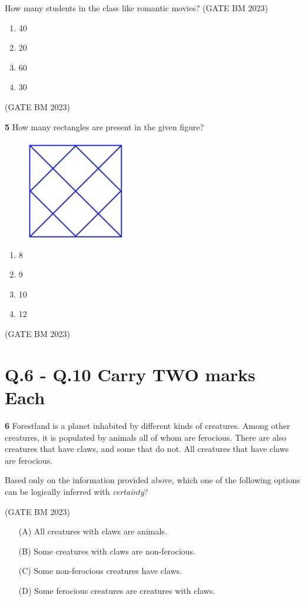 \documentclass[journal]{IEEEtran}
\numberwithin{equation}{enumi}
\numberwithin{figure}{enumi}
\begin{document}
How many students in the class like romantic movies?
\hfill (GATE BM 2023)

\begin{enumerate}
    \item 40
    \item 20
    \item 60
    \item 30
\end{enumerate}
\hfill (GATE BM 2023)

\newpage
\textbf{5} 
How many rectangles are present in the given figure?
\begin{figure}[H]
    \centering
    \includegraphics[width=0.4\textwidth]{Figs/Q5}
    \caption{}
    \label{}
\end{figure}

\begin{enumerate}
    \item 8
    \item 9
    \item 10
    \item 12
\end{enumerate}
\hfill (GATE BM 2023)

\section*{Q.6 - Q.10 Carry TWO marks Each}

\textbf{6} 
Forestland is a planet inhabited by different kinds of creatures. Among other creatures, it is populated by animals all of whom are ferocious. There are also creatures that have claws, and some that do not. All creatures that have claws are ferocious.



Based only on the information provided above, which one of the following options can be logically inferred with \textit{certainty}?

\hfill (GATE BM 2023)

\begin{enumerate}
    \item[(A)] All creatures with claws are animals.
    \item[(B)] Some creatures with claws are non-ferocious.
    \item[(C)] Some non-ferocious creatures have claws.
    \item[(D)] Some ferocious creatures are creatures with claws.
\end{enumerate}
\end{document}
